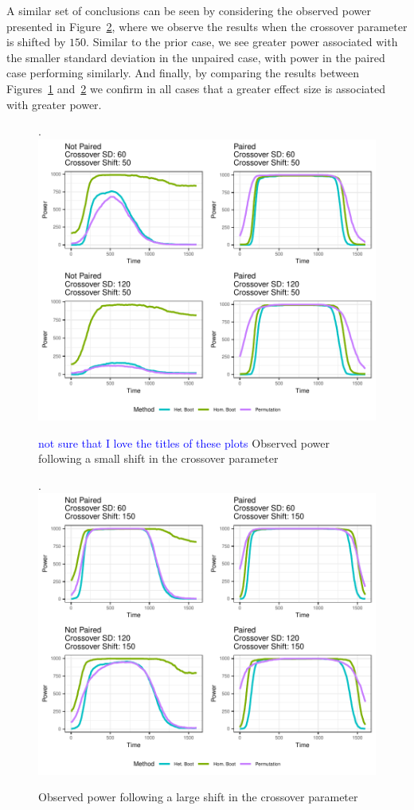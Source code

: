\documentclass{article}
\providecommand{\cn}[1]{\textcolor{blue}{#1}}
\begin{document}
A similar set of conclusions can be seen by considering the observed power presented in Figure~\ref{fig:log_shift_2}, where we observe the results when the crossover parameter is shifted by $150$. Similar to the prior case, we see greater power associated with the smaller standard deviation in the unpaired case, with power in the paired case performing similarly. And finally, by comparing the results between Figures~\ref{fig:log_shift_1} and~\ref{fig:log_shift_2} we confirm in all cases that a greater effect size is associated with greater power. 

\begin{figure}[t]
\centering.
\includegraphics{log_shift_1.pdf}
\caption{\cn{not sure that I love the titles of these plots} Observed power following a small shift in the crossover parameter}
\label{fig:log_shift_1}
\end{figure}

\begin{figure}[t]
\centering.
\includegraphics{log_shift_2.pdf}
\caption{Observed power following a large shift in the crossover parameter}
\label{fig:log_shift_2}
\end{figure}
\end{document}
